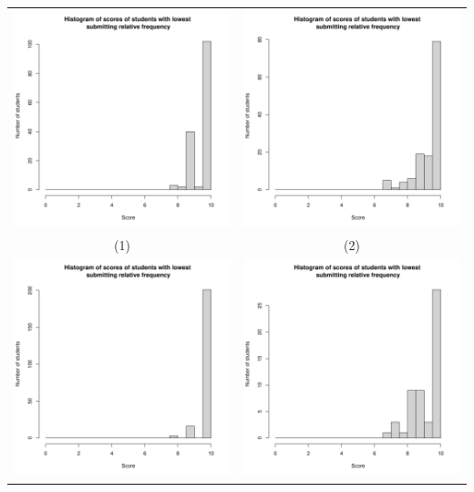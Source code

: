 \documentclass[a4paper]{article}
\theoremstyle{definition}
\begin{document}
\begin{enumerate}[a)]
\begin{itemize}
\begin{center}
\begin{tabular}{c c}
             \includegraphics[width = 6.9cm]{Images/img4-2-1.png} & 
             \includegraphics[width = 6.9cm]{Images/img4-2-2.png} \\
             (1) & (2) \\
             \includegraphics[width = 6.9cm]{Images/img4-2-3.png} &
             \includegraphics[width = 6.9cm]{Images/img4-2-4.png} \\

\end{tabular}
\end{center}
\end{itemize}
\end{enumerate}
\end{document}
